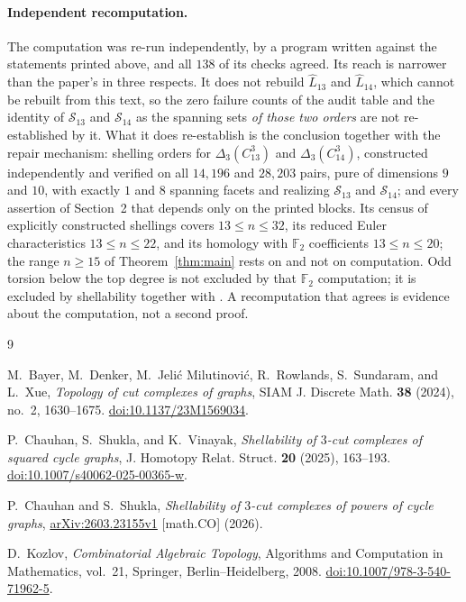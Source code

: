 \documentclass[11pt]{amsart}
\theoremstyle{remark}
\begin{document}
\paragraph{Independent recomputation.}
The computation was re-run independently, by a program written against the
statements printed above, and all $138$ of its checks agreed.  Its reach is
narrower than the paper's in three respects.  It does not rebuild
$\widehat L_{13}$ and $\widehat L_{14}$, which cannot be rebuilt from this
text, so the zero failure counts of the audit table and the identity of
$\mathcal S_{13}$ and $\mathcal S_{14}$ as the spanning sets \emph{of those
two orders} are not re-established by it.  What it does re-establish is the
conclusion together
with the repair mechanism: shelling orders for $\Delta_3(C_{13}^3)$ and
$\Delta_3(C_{14}^3)$, constructed independently and verified on all
$14{,}196$ and $28{,}203$ pairs, pure of dimensions $9$ and $10$, with exactly
$1$ and $8$ spanning facets and realizing $\mathcal S_{13}$ and
$\mathcal S_{14}$; and every assertion of Section~2 that depends only on the
printed blocks.  Its census of explicitly constructed shellings covers
$13\le n\le32$, its reduced Euler characteristics $13\le n\le22$, and its
homology with $\mathbb F_2$ coefficients $13\le n\le20$; the range $n\ge15$ of
Theorem~\ref{thm:main} rests on \cite[Theorem~1.4]{CS} and not on computation.
Odd torsion below the top degree is not excluded by that $\mathbb F_2$
computation; it is excluded by shellability together with
\cite[Theorem~12.3]{Kozlov}.  A recomputation that agrees is evidence about
the computation, not a second proof.

\begin{thebibliography}{9}

M.~Bayer, M.~Denker, M.~Jeli\'c Milutinovi\'c, R.~Rowlands, S.~Sundaram,
and L.~Xue,
\emph{Topology of cut complexes of graphs},
SIAM J. Discrete Math. \textbf{38} (2024), no.~2, 1630--1675.
\href{https://doi.org/10.1137/23M1569034}{doi:10.1137/23M1569034}.

P.~Chauhan, S.~Shukla, and K.~Vinayak,
\emph{Shellability of $3$-cut complexes of squared cycle graphs},
J. Homotopy Relat. Struct. \textbf{20} (2025), 163--193.
\href{https://doi.org/10.1007/s40062-025-00365-w}
{doi:10.1007/s40062-025-00365-w}.

P.~Chauhan and S.~Shukla,
\emph{Shellability of $3$-cut complexes of powers of cycle graphs},
\href{https://arxiv.org/abs/2603.23155}{arXiv:2603.23155v1} [math.CO] (2026).

D.~Kozlov,
\emph{Combinatorial Algebraic Topology},
Algorithms and Computation in Mathematics, vol.~21,
Springer, Berlin--Heidelberg, 2008.
\href{https://doi.org/10.1007/978-3-540-71962-5}
{doi:10.1007/978-3-540-71962-5}.

\end{thebibliography}
\end{document}

